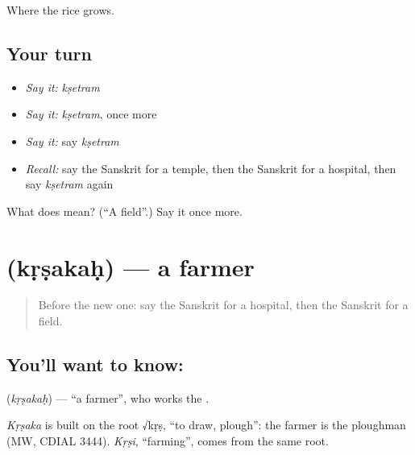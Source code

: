 \begin{grammarlens}[title={What you've built}]
Where the rice grows.
\end{grammarlens}

\subsection*{Your turn}
\begin{itemize}
\raggedright
  \item \emph{Say it:} \emph{kṣetram}
  \item \emph{Say it:} \emph{kṣetram}, once more
  \item \emph{Say it:} say \emph{kṣetram}
  \item \emph{Recall:} say the Sanskrit for a temple, then the Sanskrit for a hospital, then say \emph{kṣetram} again
\end{itemize}

\begin{tcolorbox}[breakable,colback=teal!4,colframe=teal!35!black,title={Before you move on}]
What does  mean? (\textquotedblleft{}A field\textquotedblright{}.) Say it once more.
\end{tcolorbox}
\section[\texorpdfstring{\sk{कृषकः} (kṛṣakaḥ)}{कृषकः (kṛṣakaḥ)}]{ (kṛṣakaḥ) — a farmer}

\label{lesson:SA-C84-farmer}



\begin{quote}
Before the new one: say the Sanskrit for a hospital, then the Sanskrit for a field.
\end{quote}

\subsection*{You'll want to know: }
\textbf{} (\emph{kṛṣakaḥ}) — \textquotedblleft{}a farmer\textquotedblright{}, who works the \textbf{}.

\begin{cousinweb}
\emph{Kṛṣaka} is built on the root √kṛṣ, \textquotedblleft{}to draw, plough\textquotedblright{}: the farmer is the ploughman (MW, CDIAL 3444). \emph{Kṛṣi}, \textquotedblleft{}farming\textquotedblright{}, comes from the same root.
\end{cousinweb}

